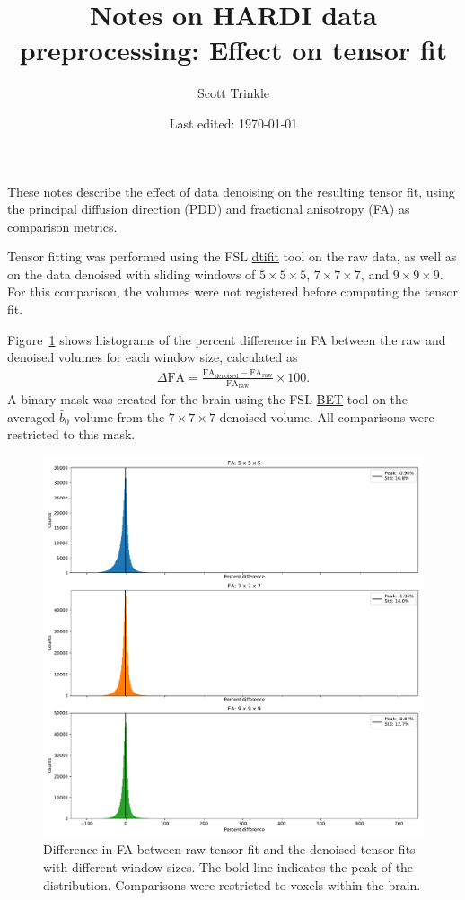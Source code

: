 \documentclass{article}
\title{Notes on HARDI data preprocessing: Effect on tensor fit}
\author{Scott Trinkle}
\date{Last edited: \today}
\begin{document}
\maketitle

These notes describe the effect of data denoising on the resulting tensor
fit, using the principal diffusion direction (PDD) and fractional anisotropy (FA)
as comparison metrics.

Tensor fitting was performed using the FSL
\href{https://fsl.fmrib.ox.ac.uk/fsl/fslwiki/FDT/UserGuide}{dtifit} tool on the
raw data, as well as on the data denoised with sliding windows of
$5\times 5\times 5$, $7\times 7\times 7$, and $9\times 9\times 9$. For this
comparison, the volumes were not registered before computing the tensor fit.

Figure~\ref{fig:FA} shows histograms of the percent difference in FA between the
raw and denoised volumes for each window size, calculated as
\begin{align}
  \Delta \text{FA} = \frac{\text{FA}_{\text{denoised}} - \text{FA}_{\text{raw}}}{\text{FA}_{\text{raw}}} \times 100.
\end{align}
A binary mask was created for the brain using the FSL
\href{https://fsl.fmrib.ox.ac.uk/fsl/fslwiki/BET/UserGuide}{BET} tool on the
averaged $\bar{b}_0$ volume from the $7\times 7\times 7$ denoised volume. All
comparisons were restricted to this mask.

\begin{figure}[h]
  \centering
  \captionsetup{width=0.6\linewidth}  
  \includegraphics[width=0.6\linewidth]{../figs/noreg_fa}
  \caption{Difference in FA between raw tensor fit and the denoised tensor fits
    with different window sizes. The bold line indicates the peak of the
    distribution. Comparisons were restricted to voxels within the brain. }
  \label{fig:FA}
\end{figure}
\end{document}
